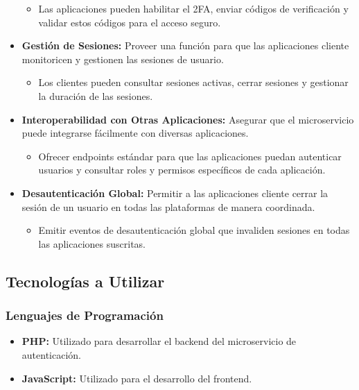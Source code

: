 \begin{itemize}
          \begin{itemize}
              \item Las aplicaciones pueden habilitar el 2FA, enviar códigos de verificación y validar estos códigos para el acceso seguro.
          \end{itemize}
    \item \textbf{Gestión de Sesiones:} Proveer una función para que las aplicaciones cliente monitoricen y gestionen las sesiones de usuario.
          \begin{itemize}
              \item Los clientes pueden consultar sesiones activas, cerrar sesiones y gestionar la duración de las sesiones.
          \end{itemize}
    \item \textbf{Interoperabilidad con Otras Aplicaciones:} Asegurar que el microservicio puede integrarse fácilmente con diversas aplicaciones.
          \begin{itemize}
              \item Ofrecer endpoints estándar para que las aplicaciones puedan autenticar usuarios y consultar roles y permisos específicos de cada aplicación.
          \end{itemize}
    \item \textbf{Desautenticación Global:} Permitir a las aplicaciones cliente cerrar la sesión de un usuario en todas las plataformas de manera coordinada.
          \begin{itemize}
              \item Emitir eventos de desautenticación global que invaliden sesiones en todas las aplicaciones suscritas.
          \end{itemize}
\end{itemize}

\subsection{Tecnologías a Utilizar}

\subsubsection{Lenguajes de Programación}
\begin{itemize}
    \item \textbf{PHP:} Utilizado para desarrollar el backend del microservicio de autenticación.
    \item \textbf{JavaScript:} Utilizado para el desarrollo del frontend.
\end{itemize}


